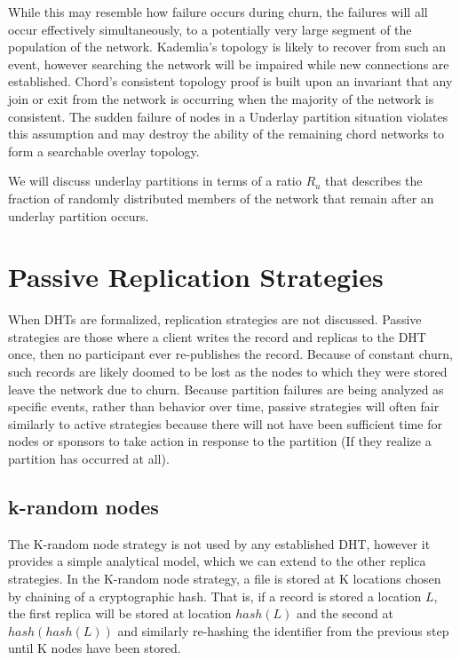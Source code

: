 While this may resemble how failure occurs during churn, the failures will all occur effectively simultaneously, to a potentially very large segment of the population of the network.
Kademlia's topology is likely to recover from such an event, however searching the network will be impaired while new connections are established.
Chord's consistent topology proof is built upon an invariant that any join or exit from the network is occurring when the majority of the network is consistent. 
The sudden failure of nodes in a Underlay partition situation violates this assumption and may destroy the ability of the remaining chord networks to form a searchable overlay topology.

We will discuss underlay partitions in terms of a ratio $R_{u}$ that describes the fraction of randomly distributed members of the network that remain after an underlay partition occurs. 

\section{Passive Replication Strategies}

When DHTs are formalized\cite{chord}\cite{kademlia}, replication strategies are not discussed.
Passive strategies are those where a client writes the record and replicas to the DHT once, then no participant ever re-publishes the record.
Because of constant churn, such records are likely doomed to be lost as the nodes to which they were stored leave the network due to churn.
Because partition failures are being analyzed as specific events, rather than behavior over time, passive strategies will often fair similarly to active strategies because there will not have been sufficient time for nodes or sponsors to take action in response to the partition (If they realize a partition has occurred at all).

\subsection{k-random nodes}
The K-random node strategy is not used by any established DHT, however it provides a simple analytical model, which we can extend to the other replica strategies.
In the K-random node strategy, a file is stored at K locations chosen by chaining of a cryptographic hash.
That is, if a record is stored a location $L$, the first replica will be stored at location $hash(L)$ and the second at $hash(hash(L))$ and similarly re-hashing the identifier from the previous step until K nodes have been stored.


